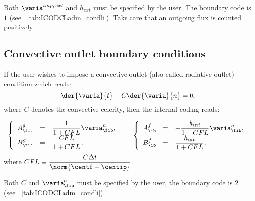 \begin{remark}
Both $\varia^{imp, \, ext} $ and $ h_{ext} $ must be specified by the user. The boundary code is $1$ (see \tablename~\ref{tab:ICODCLadm_condli}). Take care that an outgoing flux is counted positively.
\end{remark}

\subsection{Convective outlet boundary conditions}\label{sec:bndcnd:convective_outlet}

If the user wishes to impose a convective outlet (also called radiative outlet) condition which reads:
\begin{equation}
\der{ \varia}{ t} + C \der{ \varia}{ n} = 0,
\end{equation}
where $C$ denotes the convective celerity, then the internal coding reads:

\begin{equation}
\begin{array}{r c l}
\left\lbrace
\begin{array}{r c l}
A^g_\fib & = & \dfrac{1}{1+ CFL} \varia^n_\fib ,\\
B^g_\fib & = & \dfrac{CFL}{1+ CFL},
\end{array}
\right.
& &
\left\lbrace
\begin{array}{r c l}
A^f_\ib & = &  -  \dfrac{h_{int}}{1+ CFL} \varia^n_\fib,\\
B^f_\ib & = &  \dfrac{h_{int}}{1+ CFL},
\end{array}
\right.
\end{array}
\end{equation}
where $CFL \equiv \dfrac{C \Delta t}{\norm{\centf - \centip} }$.

\begin{remark}
Both $C$ and $\varia^n_\fib$ must be specified by the user, the boundary code is $2$ (see \tablename~\ref{tab:ICODCLadm_condli}).
\end{remark}

